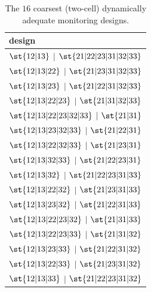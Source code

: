 \begin{table}[H]
\centering\footnotesize
\caption{The $16$ coarsest (two-cell) dynamically adequate monitoring designs.}
\label{tab:coarsest}
\begin{tabular}{l}
\toprule
design \\
\midrule
$\st{12|13}$ $\mid$ $\st{21|22|23|31|32|33}$ \\
$\st{12|13|22}$ $\mid$ $\st{21|23|31|32|33}$ \\
$\st{12|13|23}$ $\mid$ $\st{21|22|31|32|33}$ \\
$\st{12|13|22|23}$ $\mid$ $\st{21|31|32|33}$ \\
$\st{12|13|22|23|32|33}$ $\mid$ $\st{21|31}$ \\
$\st{12|13|23|32|33}$ $\mid$ $\st{21|22|31}$ \\
$\st{12|13|22|32|33}$ $\mid$ $\st{21|23|31}$ \\
$\st{12|13|32|33}$ $\mid$ $\st{21|22|23|31}$ \\
$\st{12|13|32}$ $\mid$ $\st{21|22|23|31|33}$ \\
$\st{12|13|22|32}$ $\mid$ $\st{21|23|31|33}$ \\
$\st{12|13|23|32}$ $\mid$ $\st{21|22|31|33}$ \\
$\st{12|13|22|23|32}$ $\mid$ $\st{21|31|33}$ \\
$\st{12|13|22|23|33}$ $\mid$ $\st{21|31|32}$ \\
$\st{12|13|23|33}$ $\mid$ $\st{21|22|31|32}$ \\
$\st{12|13|22|33}$ $\mid$ $\st{21|23|31|32}$ \\
$\st{12|13|33}$ $\mid$ $\st{21|22|23|31|32}$ \\
\bottomrule
\end{tabular}
\end{table}
